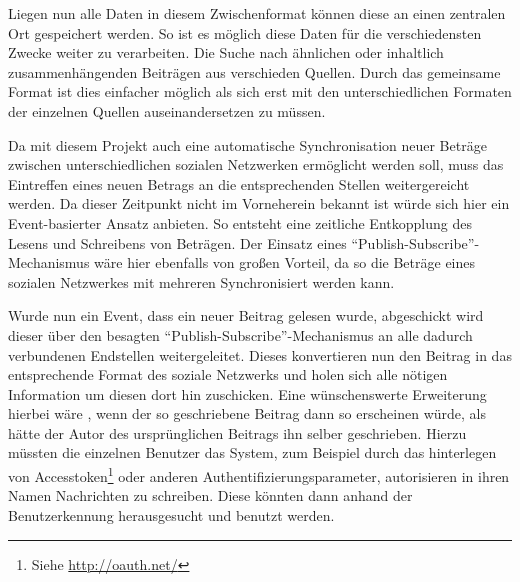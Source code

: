 \medskip

Liegen nun alle Daten in diesem Zwischenformat können diese an einen zentralen Ort gespeichert werden. So ist es möglich diese Daten für die verschiedensten Zwecke weiter zu verarbeiten. Die Suche nach ähnlichen oder inhaltlich zusammenhängenden Beiträgen aus verschieden Quellen. Durch das gemeinsame Format ist dies  einfacher möglich als sich erst mit den unterschiedlichen Formaten der einzelnen Quellen auseinandersetzen zu müssen.

\medskip

Da mit diesem Projekt auch eine automatische Synchronisation neuer Beträge zwischen unterschiedlichen sozialen Netzwerken ermöglicht werden soll, muss das Eintreffen eines neuen Betrags an die entsprechenden Stellen weitergereicht werden. Da dieser Zeitpunkt nicht im Vorneherein bekannt ist würde sich hier ein Event-basierter Ansatz anbieten. So entsteht eine zeitliche Entkopplung des Lesens und Schreibens von Beträgen. Der Einsatz eines \enquote{Publish-Subscribe}-Mechanismus wäre hier ebenfalls von großen Vorteil, da so die Beträge eines sozialen Netzwerkes mit mehreren Synchronisiert werden kann. 

\medskip

Wurde nun ein Event, dass ein neuer Beitrag gelesen wurde, abgeschickt wird dieser über den besagten \enquote{Publish-Subscribe}-Mechanismus an alle dadurch verbundenen Endstellen weitergeleitet. Dieses konvertieren nun den Beitrag in das entsprechende Format des soziale Netzwerks und holen sich alle nötigen Information um diesen dort hin zuschicken. Eine wünschenswerte Erweiterung hierbei wäre , wenn der so geschriebene Beitrag dann so erscheinen würde, als hätte der Autor des ursprünglichen Beitrags ihn selber geschrieben. Hierzu müssten die einzelnen Benutzer das System, zum Beispiel durch das hinterlegen von Accesstoken\footnote{Siehe \url{http://oauth.net/}} oder anderen Authentifizierungsparameter, autorisieren in ihren Namen Nachrichten zu schreiben. Diese könnten dann anhand der Benutzerkennung herausgesucht und benutzt werden. 

